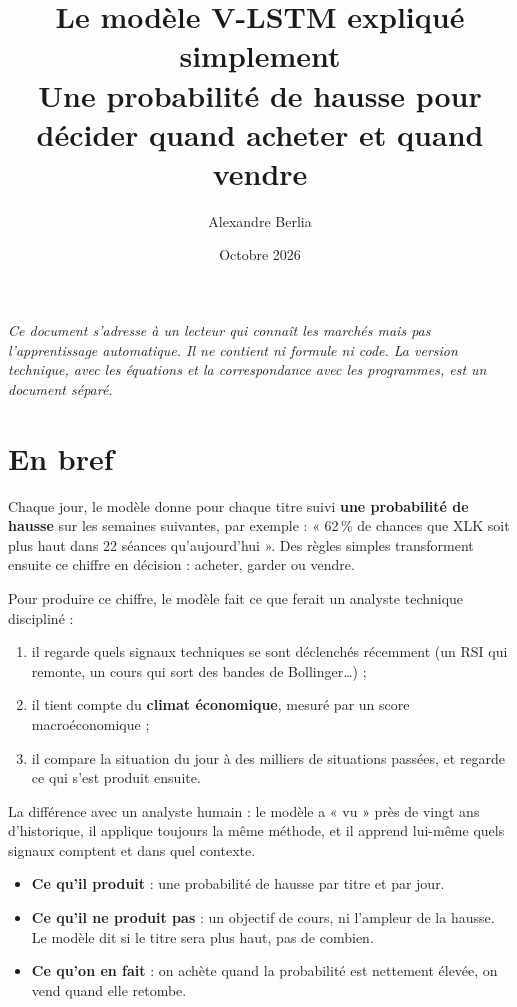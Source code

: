 \documentclass[11pt,a4paper]{article}
\title{\textbf{Le modèle V-LSTM expliqué simplement}\\[4pt]
\large Une probabilité de hausse pour décider quand acheter et quand vendre}
\author{Alexandre Berlia}
\date{Octobre 2026}
\begin{document}
\maketitle

\noindent\textit{Ce document s'adresse à un lecteur qui connaît les marchés mais pas
l'apprentissage automatique. Il ne contient ni formule ni code. La version technique, avec
les équations et la correspondance avec les programmes, est un document séparé.}

\setcounter{tocdepth}{1}
\tableofcontents
\newpage

\section{En bref}
Chaque jour, le modèle donne pour chaque titre suivi \textbf{une probabilité de hausse}
sur les semaines suivantes, par exemple : « 62\,\% de chances que XLK soit plus haut dans
22 séances qu'aujourd'hui ». Des règles simples transforment ensuite ce chiffre en
décision : acheter, garder ou vendre.

Pour produire ce chiffre, le modèle fait ce que ferait un analyste technique discipliné :
\begin{enumerate}[nosep]
  \item il regarde quels signaux techniques se sont déclenchés récemment (un RSI qui
  remonte, un cours qui sort des bandes de Bollinger\dots) ;
  \item il tient compte du \textbf{climat économique}, mesuré par un score macroéconomique ;
  \item il compare la situation du jour à des milliers de situations passées, et regarde
  ce qui s'est produit ensuite.
\end{enumerate}

La différence avec un analyste humain : le modèle a « vu » près de vingt ans d'historique,
il applique toujours la même méthode, et il apprend lui-même quels signaux comptent et
dans quel contexte.

\begin{resume}
\begin{itemize}[nosep]
  \item \textbf{Ce qu'il produit} : une probabilité de hausse par titre et par jour.
  \item \textbf{Ce qu'il ne produit pas} : un objectif de cours, ni l'ampleur de la hausse.
  Le modèle dit si le titre sera plus haut, pas de combien.
  \item \textbf{Ce qu'on en fait} : on achète quand la probabilité est nettement élevée,
  on vend quand elle retombe.
\end{itemize}
\end{resume}
\end{document}
